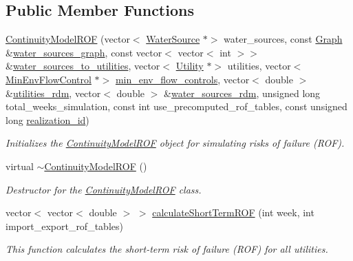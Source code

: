 \subsection*{Public Member Functions}
\begin{DoxyCompactItemize}
\item 
\mbox{\hyperlink{classContinuityModelROF_a23bd422349e4e2246bd44b2007564fd1}{Continuity\+Model\+R\+OF}} (vector$<$ \mbox{\hyperlink{classWaterSource}{Water\+Source}} $\ast$$>$ water\+\_\+sources, const \mbox{\hyperlink{classGraph}{Graph}} \&\mbox{\hyperlink{classContinuityModel_a563401588c6fa622f03393909a3522db}{water\+\_\+sources\+\_\+graph}}, const vector$<$ vector$<$ int $>$$>$ \&\mbox{\hyperlink{classContinuityModel_ae8516bcbbf52650190277fc8b06c1843}{water\+\_\+sources\+\_\+to\+\_\+utilities}}, vector$<$ \mbox{\hyperlink{classUtility}{Utility}} $\ast$$>$ utilities, vector$<$ \mbox{\hyperlink{classMinEnvFlowControl}{Min\+Env\+Flow\+Control}} $\ast$$>$ \mbox{\hyperlink{classContinuityModel_afc991e5c0d144020e49a97751a04b302}{min\+\_\+env\+\_\+flow\+\_\+controls}}, vector$<$ double $>$ \&\mbox{\hyperlink{classContinuityModel_aa4a00b76da6295d2faa11e3dcaea1896}{utilities\+\_\+rdm}}, vector$<$ double $>$ \&\mbox{\hyperlink{classContinuityModel_ab7b8fa93a6f56b328e425e1ead6cfefa}{water\+\_\+sources\+\_\+rdm}}, unsigned long total\+\_\+weeks\+\_\+simulation, const int use\+\_\+precomputed\+\_\+rof\+\_\+tables, const unsigned long \mbox{\hyperlink{classContinuityModel_a7b6c99bf256f6c6b633ebb78282f43c7}{realization\+\_\+id}})
\begin{DoxyCompactList}\small\item\em Initializes the \mbox{\hyperlink{classContinuityModelROF}{Continuity\+Model\+R\+OF}} object for simulating risks of failure (R\+OF). \end{DoxyCompactList}\item 
virtual \mbox{\hyperlink{classContinuityModelROF_a4acab850e28a3a41182a19d86a7de709}{$\sim$\+Continuity\+Model\+R\+OF}} ()
\begin{DoxyCompactList}\small\item\em Destructor for the \mbox{\hyperlink{classContinuityModelROF}{Continuity\+Model\+R\+OF}} class. \end{DoxyCompactList}\item 
vector$<$ vector$<$ double $>$ $>$ \mbox{\hyperlink{classContinuityModelROF_a0386963b5914aaaa145de60a2ff1f84e}{calculate\+Short\+Term\+R\+OF}} (int week, int import\+\_\+export\+\_\+rof\+\_\+tables)
\begin{DoxyCompactList}\small\item\em This function calculates the short-\/term risk of failure (R\+OF) for all utilities. \end{DoxyCompactList}\item 

\end{DoxyCompactItemize}
